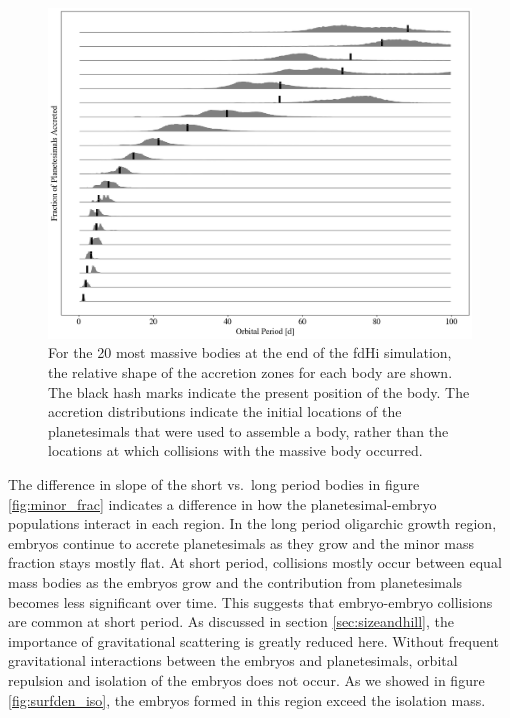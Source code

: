 \documentclass[twocolumn]{aastex63}
\begin{document}
\begin{figure}
\begin{center}
    \includegraphics[width=\textwidth]{figures/acc_zones.png}
    \caption{For the 20 most massive bodies at the end of the fdHi simulation, the relative shape of the accretion zones for each body are shown. The black hash marks indicate the present position of the body. The accretion distributions indicate the initial locations of the planetesimals that were used to assemble a body, rather than the locations at which collisions with the massive body occurred.\label{fig:acc_zones}}
\end{center}
\end{figure}

The difference in slope of the short vs.\ long period bodies in figure \ref{fig:minor_frac} indicates a difference in how the planetesimal-embryo populations interact in each region. In the long period oligarchic growth region, embryos continue to accrete planetesimals as they grow and the minor mass fraction stays mostly flat. At short period, collisions mostly occur between equal mass bodies as the embryos grow and the contribution from planetesimals becomes less significant over time. This suggests that embryo-embryo collisions are common at short period. As discussed in section \ref{sec:sizeandhill}, the importance of gravitational scattering is greatly reduced here. Without frequent gravitational interactions between the embryos and planetesimals, orbital repulsion \citep{kokubo98} and isolation of the embryos does not occur. As we showed in figure \ref{fig:surfden_iso}, the embryos formed in this region exceed the isolation mass.
\end{document}

